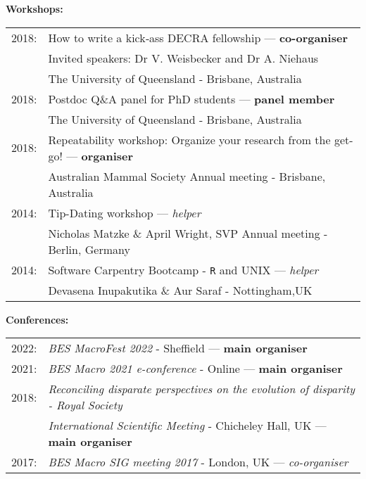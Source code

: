 \documentclass[10pt,a4paper]{article}
\begin{document}
{\bigskip
\raggedright\textbf{Workshops:}

\begin{tabular}{ll}
2018: & How to write a kick‐ass DECRA fellowship --- \textbf{co-organiser}\\
      & Invited speakers: Dr V. Weisbecker and Dr A. Niehaus\\
      & The University of Queensland - Brisbane, Australia\\
2018: & Postdoc Q\&A panel for PhD students --- \textbf{panel member}\\
      & The University of Queensland - Brisbane, Australia\\
2018: & Repeatability workshop: Organize your research from the get-go! --- \textbf{organiser}\\
      & Australian Mammal Society Annual meeting - Brisbane, Australia\\
2014: & Tip-Dating workshop --- \textit{helper}\\
      & Nicholas Matzke \& April Wright, SVP Annual meeting - Berlin, Germany\\
2014: & Software Carpentry Bootcamp - \texttt{R} and UNIX --- \textit{helper}\\
      & Devasena Inupakutika \& Aur Saraf - Nottingham,UK\\
\end{tabular}

\bigskip

\raggedright\textbf{Conferences:}\\
\begin{tabular}{ll}
2022: & \textit{BES MacroFest 2022} - Sheffield --- \textbf{main organiser}\\
2021: & \textit{BES Macro 2021 e-conference} - Online --- \textbf{main organiser}\\
2018: & \textit{Reconciling disparate perspectives on the evolution of disparity - Royal Society}\\
      & \textit{International Scientific Meeting} - Chicheley Hall, UK --- \textbf{main organiser}\\
2017: & \textit{BES Macro SIG meeting 2017} - London, UK --- \textit{co-organiser}\\
\end{tabular}

\bigskip

}
\end{document}
